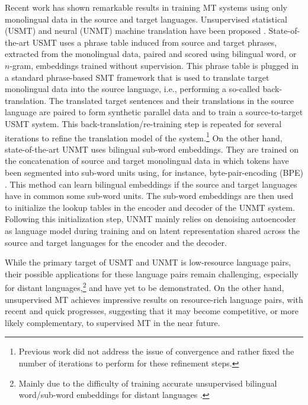\documentclass[11pt,a4paper]{article}
\begin{document}
Recent work has shown remarkable results in training MT systems using only monolingual data in the source and target languages.  Unsupervised statistical (USMT) and neural (UNMT) machine translation have been proposed \citep{artetxe2018unsupervised,DBLP:journals/corr/abs-1804-07755}. 
State-of-the-art USMT \citep{artetxe2018unsupervised,DBLP:journals/corr/abs-1804-07755} uses a phrase table induced from source and target phrases, extracted from the monolingual data, paired and scored using bilingual word, or $n$-gram, embeddings trained without supervision. This phrase table is plugged in a standard phrase-based SMT framework that is used to translate target monolingual data into the source language, i.e., performing a so-called back-translation. The translated target sentences and their translations in the source language are paired to form synthetic parallel data and to train a source-to-target USMT system.  This back-translation/re-training step is repeated for several iterations to refine the translation model of the system.\footnote{Previous work did not address the issue of convergence and rather fixed the number of iterations to perform for these refinement steps.}
On the other hand, state-of-the-art UNMT \citep{DBLP:journals/corr/abs-1804-07755} uses bilingual sub-word embeddings. They are trained on the concatenation of source and target monolingual data in which tokens have been segmented into sub-word units using, for instance, byte-pair-encoding (BPE) \citep{sennrich-haddow-birch:2016:P16-12}. This method can learn bilingual embeddings if the source and target languages have in common some sub-word units. The sub-word embeddings are then used to initialize the lookup tables in the encoder and decoder of the UNMT system. Following this initialization step, UNMT mainly relies on denoising autoencoder as language model during training and on latent representation shared across the source and target languages for the encoder and the decoder.

While the primary target of USMT and UNMT is low-resource language pairs, their possible applications for these language pairs remain challenging, especially for distant languages,\footnote{Mainly due to the difficulty of training accurate unsupervised bilingual word/sub-word embeddings for distant languages \citep{P18-1072}.} and have yet to be demonstrated. On the other hand, unsupervised MT achieves impressive results on resource-rich language pairs, with recent and quick progresses, suggesting that it may become competitive, or more likely complementary, to supervised MT in the near future.
\end{document}

